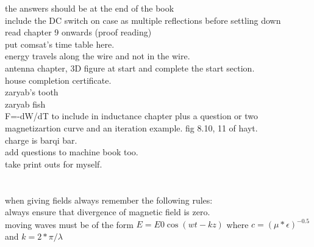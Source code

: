 \begin{otherlanguage}{english}
the answers should be at the end of the book\\
include the DC switch on case as multiple reflections before settling down\\
read chapter 9 onwards (proof reading)\\
put comsat's time table here.\\
energy travels along the wire and not in the wire.\\
antenna chapter, 3D figure at start and complete the start section.\\
house completion certificate.\\
zaryab's tooth\\
zaryab fish\\
F=-dW/dT to include in inductance chapter plus a question or two\\
magnetizartion curve and an iteration example. fig 8.10, 11 of hayt.\\
charge is barqi bar.\\
add questions to machine book too.\\
take print outs for myself.\\
\\
\\
when giving fields always remember the following rules:\\
always ensure that divergence of magnetic field is zero.\\
moving waves must be of the form $E=E0 \cos(wt-kz)$ where $c=(\mu*\epsilon)^{-0.5}$ and $k=2*\pi/\lambda$

\end{otherlanguage}
